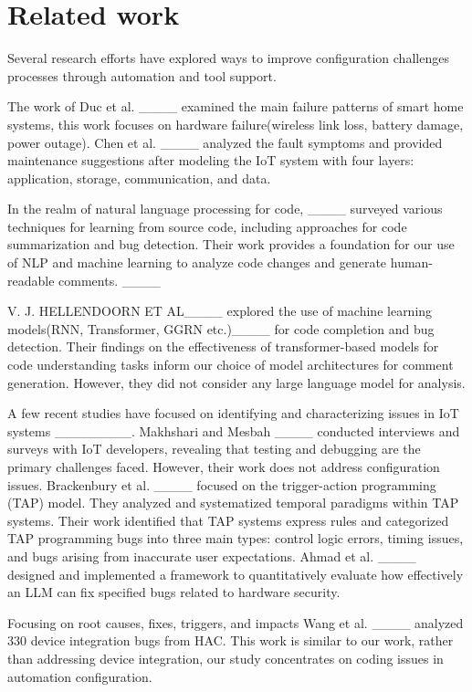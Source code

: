 \section{Related work}
Several research efforts have explored ways to improve configuration challenges processes through automation and tool support.

The work of Duc et al. ____ examined the main failure patterns of smart home systems, this work focuses on hardware failure(wireless link loss, battery damage, power outage). Chen et al. ____ analyzed the fault symptoms and provided maintenance suggestions after modeling the IoT system with four layers: application, storage, communication, and data.

In the realm of natural language processing for code, ____ surveyed various techniques for learning from source code, including approaches for code summarization and bug detection. Their work provides a foundation for our use of NLP and machine learning to analyze code changes and generate human-readable comments. ____

V. J. HELLENDOORN ET AL____ explored the use of machine learning models(RNN, Transformer, GGRN etc.)____ for code completion and bug detection. Their findings on the effectiveness of transformer-based models for code understanding tasks inform our choice of model architectures for comment generation. However, they did not consider any large language model for analysis.

A few recent studies have focused on identifying and characterizing issues in IoT systems ________. Makhshari and Mesbah ____ conducted interviews and surveys with IoT developers, revealing that testing and debugging are the primary challenges faced. However, their work does not address configuration issues. Brackenbury et al. ____ focused on the trigger-action programming (TAP) model. They analyzed and systematized temporal paradigms within TAP systems. Their work identified that TAP systems express rules and categorized TAP programming bugs into three main types: control logic errors, timing issues, and bugs arising from inaccurate user expectations. Ahmad et al. ____ designed and implemented a framework to quantitatively evaluate how effectively an LLM can fix specified bugs related to hardware security.

Focusing on root causes, fixes, triggers, and impacts Wang et al. ____ analyzed 330 device integration bugs from HAC. This work is similar to our work, rather than addressing device integration, our study concentrates on coding issues in automation configuration.

